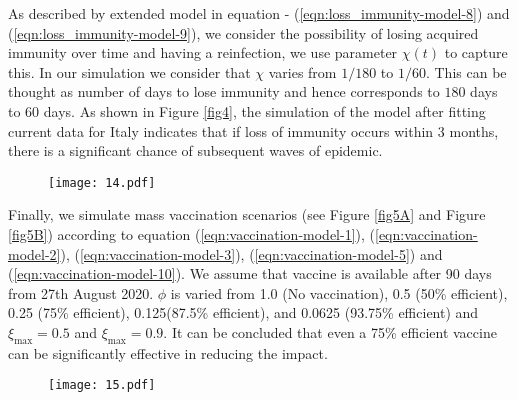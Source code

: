\documentclass[10pt]{wlscirep}
\begin{document}
As described by extended model in equation - (\ref{eqn:loss_immunity-model-8}) and (\ref{eqn:loss_immunity-model-9}), we consider the possibility of losing acquired immunity over time and having a reinfection, we use parameter $\chi(t)$ to capture this. In our simulation we consider that $\chi$ varies from $1/180$ to $1/60$. This can be thought as number of days to lose immunity and hence corresponds to $180$ days to $60$ days. As shown in Figure \ref{fig4}, the simulation of the model after fitting current data for Italy indicates that if loss of immunity occurs within 3 months, there is a significant chance of subsequent waves of epidemic.  

%
\begin{figure*}[!htb]
	\centering
	\begin{subfigure}[b]{0.7\textwidth}
		\centering
		\texttt{[image: 14.pdf]}
	\end{subfigure}
	\caption{Sensitivity of $\chi(t)$ with loss of acquired immunity over time by $180, 150, 120, 90$ and $60$ days (Italy). Note that not all panels are in the same scale.}
	\label{fig4} 
\end{figure*}
%

Finally, we simulate mass vaccination scenarios (see Figure \ref{fig5A} and Figure \ref{fig5B}) according to equation (\ref{eqn:vaccination-model-1}), (\ref{eqn:vaccination-model-2}), (\ref{eqn:vaccination-model-3}), (\ref{eqn:vaccination-model-5}) and (\ref{eqn:vaccination-model-10}). We assume that vaccine is available after 90 days from 27th August 2020. $\phi$ is varied from 1.0 (No vaccination), 0.5 (50\% efficient), 0.25 (75\% efficient), 0.125(87.5\% efficient), and 0.0625 (93.75\% efficient) and $\xi_{\max} = 0.5$ and $\xi_{\max} = 0.9$. It can be concluded that even a 75\% efficient vaccine can be significantly effective in reducing the impact.

\begin{figure*}[!htb]
	\centering
	\begin{subfigure}[b]{0.7\textwidth}
		\centering
		\texttt{[image: 15.pdf]}
	\end{subfigure}
	\caption{Sensitivity of vaccine efficiency parameter $(1-\phi)$, where $\phi = 0$ represents vaccine that offers $100\%$ protection against infection, and $\xi_{\max} = 0.5$, i.e. maximum of 50\% population is administered with vaccine. $\phi$ is varied from 1.0 (No vaccination), 0.5 (50\% efficient), 0.25 (75\% efficient), 0.125(87.5\% efficient), and 0.0625 (93.75\% efficient) (Italy)}
	\label{fig5A} 
\end{figure*}
\end{document}
